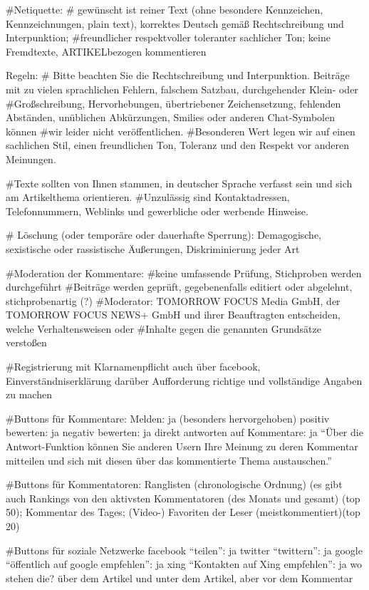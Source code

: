 	
#Netiquette: 
#	gewünscht ist reiner Text (ohne besondere Kennzeichen, Kennzeichnungen, plain text), korrektes Deutsch gemäß Rechtschreibung und Interpunktion; #freundlicher respektvoller toleranter sachlicher Ton; keine Fremdtexte, ARTIKELbezogen kommentieren
	
	
	Regeln: 
#	Bitte beachten Sie die Rechtschreibung und Interpunktion. Beiträge mit zu vielen sprachlichen Fehlern, falschem Satzbau, durchgehender Klein- oder #Großschreibung, Hervorhebungen, übertriebener Zeichensetzung, fehlenden Abständen, unüblichen Abkürzungen, Smilies oder anderen Chat-Symbolen können #wir leider nicht veröffentlichen.
#Besonderen Wert legen wir auf einen sachlichen Stil, einen freundlichen Ton, Toleranz und den Respekt vor anderen Meinungen.


#Texte sollten von Ihnen stammen, in deutscher Sprache verfasst sein und sich am Artikelthema orientieren.
#Unzulässig sind Kontaktadressen, Telefonnummern, Weblinks und gewerbliche oder werbende Hinweise.

#	Löschung (oder temporäre oder dauerhafte Sperrung): Demagogische, sexistische oder rassistische Äußerungen, Diskriminierung jeder Art
	

#Moderation der Kommentare: 
#keine umfassende Prüfung, Stichproben werden durchgeführt
#Beiträge werden geprüft, gegebenenfalls editiert oder abgelehnt, stichprobenartig (?)
#Moderator: TOMORROW FOCUS Media GmbH, der TOMORROW FOCUS NEWS+ GmbH und ihrer Beauftragten entscheiden, welche Verhaltensweisen oder #Inhalte gegen die genannten Grundsätze verstoßen


#Registrierung 
	mit Klarnamenpflicht 
	auch über facebook, Einverständniserklärung darüber
	Aufforderung richtige und vollständige Angaben zu machen
	
	
	
#Buttons für Kommentare: 
	Melden: ja (besonders hervorgehoben)
	positiv bewerten: ja
	negativ bewerten: ja
	direkt antworten auf Kommentare: ja ``Über die Antwort-Funktion können Sie anderen Usern Ihre Meinung zu deren Kommentar mitteilen und sich mit diesen über das kommentierte Thema austauschen.''


#Buttons für Kommentatoren: 
	Ranglisten (chronologische Ordnung) (es gibt auch Rankings von den aktivsten Kommentatoren (des Monats und gesamt) (top 50); 
	Kommentar des Tages; 
	(Video-) Favoriten der Leser (meistkommentiert)(top 20)

#Buttons für soziale Netzwerke 
	facebook ``teilen'': ja
	twitter ``twittern'': ja
	google ``öffentlich auf google empfehlen'': ja
	xing ``Kontakten auf Xing empfehlen'': ja
	wo stehen die? über dem Artikel und unter dem Artikel, aber vor dem Kommentar


